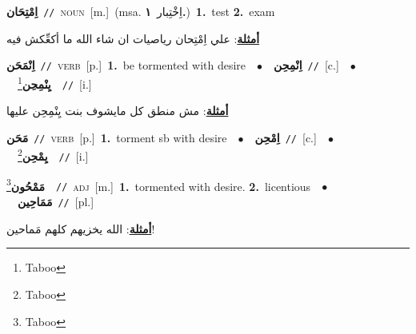 \documentclass[10pt,a4paper,twoside]{article} %
\begin{document}
\begin{multicols}{2}
{\setlength\topsep{0pt}\textbf{\foreignlanguage{arabic}{اِمْتِحَان}}\ {\color{gray}\texttt{//}\color{black}}\ \textsc{noun}\ [m.]\ \color{gray}(msa. \foreignlanguage{arabic}{اِخْتِبار}~\foreignlanguage{arabic}{\textbf{١.}})\color{black}\ \textbf{1.}~test  \textbf{2.}~exam\  \begin{flushright}\color{gray}\foreignlanguage{arabic}{\textbf{\underline{\foreignlanguage{arabic}{أمثلة}}}: علي اِمْتِحان رياصيات ان شاء الله ما أكعِّكش فيه}\end{flushright}\color{black}} \vspace{2mm}

{\setlength\topsep{0pt}\textbf{\foreignlanguage{arabic}{اِنْمَحَن}}\ {\color{gray}\texttt{//}\color{black}}\ \textsc{verb}\ [p.]\ \textbf{1.}~be tormented with desire\ \ $\bullet$\ \ \setlength\topsep{0pt}\textbf{\foreignlanguage{arabic}{اِنْمِحِن}}\ {\color{gray}\texttt{//}\color{black}}\ [c.]\ \ $\bullet$\ \ \setlength\topsep{0pt}\textbf{\foreignlanguage{arabic}{يِنْمِحِن}}\footnote{Taboo}\ \ {\color{gray}\texttt{//}\color{black}}\ [i.]\  \begin{flushright}\color{gray}\foreignlanguage{arabic}{\textbf{\underline{\foreignlanguage{arabic}{أمثلة}}}: مش منطق كل مايشوف بنت يِنْمِحِن عليها}\end{flushright}\color{black}} \vspace{2mm}

{\setlength\topsep{0pt}\textbf{\foreignlanguage{arabic}{مَحَن}}\ {\color{gray}\texttt{//}\color{black}}\ \textsc{verb}\ [p.]\ \textbf{1.}~torment sb with desire\ \ $\bullet$\ \ \setlength\topsep{0pt}\textbf{\foreignlanguage{arabic}{اِمْحِن}}\ {\color{gray}\texttt{//}\color{black}}\ [c.]\ \ $\bullet$\ \ \setlength\topsep{0pt}\textbf{\foreignlanguage{arabic}{يِمْحِن}}\footnote{Taboo}\ \ {\color{gray}\texttt{//}\color{black}}\ [i.]\ } \vspace{2mm}

{\setlength\topsep{0pt}\textbf{\foreignlanguage{arabic}{مَمْحُون}}\footnote{Taboo}\ \ {\color{gray}\texttt{//}\color{black}}\ \textsc{adj}\ [m.]\ \textbf{1.}~tormented with desire.  \textbf{2.}~licentious\ \ $\bullet$\ \ \setlength\topsep{0pt}\textbf{\foreignlanguage{arabic}{مَمَاحِين}}\ {\color{gray}\texttt{//}\color{black}}\ [pl.]\  \begin{flushright}\color{gray}\foreignlanguage{arabic}{\textbf{\underline{\foreignlanguage{arabic}{أمثلة}}}: الله يخزيهم كلهم مَماحين!}\end{flushright}\color{black}} \vspace{2mm}


\end{multicols}
\end{document}
